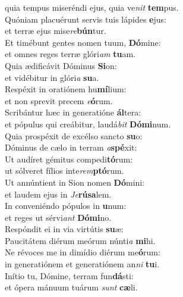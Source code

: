 \evenverse quia tempus miseréndi ejus, quia ve\textit{nit} \textbf{tem}pus.\\
\oddverse Quóniam placuérunt servis tuis lápides \textbf{e}jus:~\*\\
\oddverse et terræ ejus mise\textit{re}\textbf{bún}tur.\\
\evenverse Et timébunt gentes nomen tuum, \textbf{Dó}mine:~\*\\
\evenverse et omnes reges terræ glóri\textit{am} \textbf{tu}am.\\
\oddverse Quia ædificávit Dóminus \textbf{Si}on:~\*\\
\oddverse et vidébitur in glóri\textit{a} \textbf{su}a.\\
\evenverse Respéxit in oratiónem hu\textbf{mí}lium:~\*\\
\evenverse et non sprevit precem \textit{e}\textbf{ó}rum.\\
\oddverse Scribántur hæc in generatióne \textbf{ál}tera:~\*\\
\oddverse et pópulus qui creábitur, laudá\textit{bit} \textbf{Dó}\textbf{mi}num.\\
\evenverse Quia prospéxit de excélso sancto \textbf{su}o:~\*\\
\evenverse Dóminus de cælo in terram \textit{a}\textbf{spé}xit:\\
\oddverse Ut audíret gémitus compedi\textbf{tó}rum:~\*\\
\oddverse ut sólveret fílios inte\textit{rem}\textbf{ptó}rum.\\
\evenverse Ut annúntient in Sion nomen \textbf{Dó}mini:~\*\\
\evenverse et laudem ejus in \textit{Je}\textbf{rú}\textbf{sa}lem.\\
\oddverse In conveniéndo pópulos in \textbf{u}num:~\*\\
\oddverse et reges ut sérvi\textit{ant} \textbf{Dó}\textbf{mi}no.\\
\evenverse Respóndit ei in via virtútis \textbf{su}æ:~\*\\
\evenverse Paucitátem diérum meórum núnti\textit{a} \textbf{mi}hi.\\
\oddverse Ne révoces me in dimídio diérum me\textbf{ó}rum:~\*\\
\oddverse in generatiónem et generatiónem an\textit{ni} \textbf{tu}i.\\
\evenverse Inítio tu, Dómine, terram fun\textbf{dá}sti:~\*\\
\evenverse et ópera mánuum tuárum \textit{sunt} \textbf{cæ}li.\\
